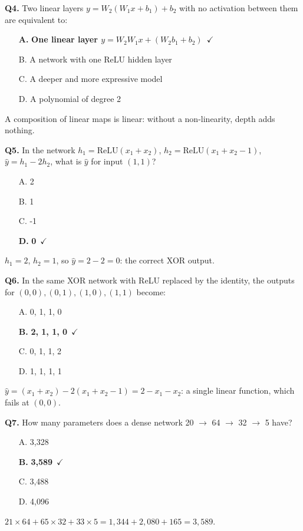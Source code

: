 \documentclass[11pt]{article}
\begin{document}
{\noindent\textbf{Q4.} Two linear layers $y=W_2(W_1x+b_1)+b_2$ with no activation between them are equivalent to:\begin{itemize}[leftmargin=2.2em,itemsep=0pt,topsep=1pt]\item[\textbf{A.}] \textbf{One linear layer $y=W_2W_1x+(W_2b_1+b_2)$}~{\color{GrnN}$\checkmark$}\item[B.] A network with one ReLU hidden layer\item[C.] A deeper and more expressive model\item[D.] A polynomial of degree 2\end{itemize} A composition of linear maps is linear: without a non-linearity, depth adds nothing.\par\medskip

\noindent\textbf{Q5.} In the network $h_1=\text{ReLU}(x_1+x_2)$, $h_2=\text{ReLU}(x_1+x_2-1)$, $\hat y=h_1-2h_2$, what is $\hat y$ for input $(1,1)$?\begin{itemize}[leftmargin=2.2em,itemsep=0pt,topsep=1pt]\item[A.] 2\item[B.] 1\item[C.] -1\item[\textbf{D.}] \textbf{0}~{\color{GrnN}$\checkmark$}\end{itemize} $h_1=2$, $h_2=1$, so $\hat y=2-2=0$: the correct XOR output.\par\medskip

\noindent\textbf{Q6.} In the same XOR network with ReLU replaced by the identity, the outputs for $(0,0),(0,1),(1,0),(1,1)$ become:\begin{itemize}[leftmargin=2.2em,itemsep=0pt,topsep=1pt]\item[A.] 0, 1, 1, 0\item[\textbf{B.}] \textbf{2, 1, 1, 0}~{\color{GrnN}$\checkmark$}\item[C.] 0, 1, 1, 2\item[D.] 1, 1, 1, 1\end{itemize} $\hat y=(x_1+x_2)-2(x_1+x_2-1)=2-x_1-x_2$: a single linear function, which fails at $(0,0)$.\par\medskip

\noindent\textbf{Q7.} How many parameters does a dense network 20 $\rightarrow$ 64 $\rightarrow$ 32 $\rightarrow$ 5 have?\begin{itemize}[leftmargin=2.2em,itemsep=0pt,topsep=1pt]\item[A.] 3,328\item[\textbf{B.}] \textbf{3,589}~{\color{GrnN}$\checkmark$}\item[C.] 3,488\item[D.] 4,096\end{itemize} $21\times64+65\times32+33\times5=1{,}344+2{,}080+165=3{,}589$.\par\medskip

}
\end{document}

